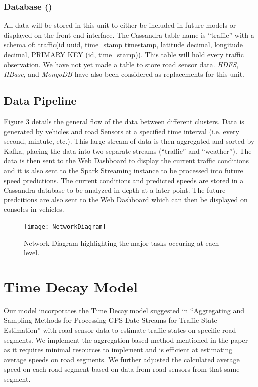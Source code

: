 \documentclass{vldb}
\begin{document}
\subsubsection{Database ()}
All data will be stored in this unit to either be included in future models or displayed on the front end interface. The Cassandra table name is ``traffic'' with a schema of: traffic(id uuid, time\_stamp timestamp, latitude decimal, longitude decimal, PRIMARY KEY (id, time\_stamp)). This table will hold every traffic observation. We have not yet made a table to store road sensor data. \textit{HDFS}, \textit{HBase}, and \textit{MongoDB} have also been considered as replacements for this unit. 

\subsection{Data Pipeline}
Figure 3 details the general flow of the data between different clusters.  Data is generated by vehicles and road Sensors at a specified time interval (i.e. every second, mintute, etc.). This large stream of data is then aggregated and sorted by Kafka, placing the data into two separate streams (``traffic'' and ``weather''). The data is then sent to the Web Dashboard to display the current traffic conditions and it is also sent to the Spark Streaming instance to be processed into future speed predictions. The current conditions and predicted speeds are stored in a Cassandra database to be analyzed in depth at a later point. The future predcitions are also sent to the Web Dashboard which can then be displayed on consoles in vehicles. 


\begin{figure}
\centering
\texttt{[image: NetworkDiagram]}
\caption{Network Diagram highlighting the major tasks occuring at each level.}
\label{fig:networkdiagram}
\end{figure}


\section{Time Decay Model}
Our model incorporates the Time Decay model suggested in “Aggregating and Sampling Methods for Processing GPS Date Streams for Traffic State Estimation” \cite{Zhang:TimeDecay} with road sensor data to estimate traffic states on specific road segments. We implement the aggregation based method mentioned in the paper as it requires minimal resources to implement and is efficient at estimating average speeds on road segments. We further adjusted the calculated average speed on each road segment based on data from road sensors from that same segment. 
\end{document}
